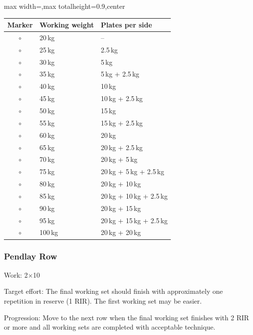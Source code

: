 \documentclass[11pt,a4paper]{article}
\newcommand{\tablearraystretch}{1.15}
\begin{document}
\begin{center}
\renewcommand{\arraystretch}{\tablearraystretch}
\begin{adjustbox}{max width=\linewidth,max totalheight=0.9\textheight,center}
\begin{tabular}{cll}
\toprule
Marker & Working weight & Plates per side \\
\midrule
$\circ$ & 20\,kg  & -- \\
$\circ$ & 25\,kg  & 2.5\,kg \\
$\circ$ & 30\,kg  & 5\,kg \\
$\circ$ & 35\,kg  & 5\,kg + 2.5\,kg \\
$\circ$ & 40\,kg  & 10\,kg \\
$\circ$ & 45\,kg  & 10\,kg + 2.5\,kg \\
$\circ$ & 50\,kg  & 15\,kg \\
$\circ$ & 55\,kg  & 15\,kg + 2.5\,kg \\
$\circ$ & 60\,kg  & 20\,kg \\
$\circ$ & 65\,kg  & 20\,kg + 2.5\,kg \\
$\circ$ & 70\,kg  & 20\,kg + 5\,kg \\
$\circ$ & 75\,kg  & 20\,kg + 5\,kg + 2.5\,kg \\
$\circ$ & 80\,kg  & 20\,kg + 10\,kg \\
$\circ$ & 85\,kg  & 20\,kg + 10\,kg + 2.5\,kg \\
$\circ$ & 90\,kg  & 20\,kg + 15\,kg \\
$\circ$ & 95\,kg  & 20\,kg + 15\,kg + 2.5\,kg \\
$\circ$ & 100\,kg & 20\,kg + 20\,kg \\
\bottomrule
\end{tabular}
\end{adjustbox}
\renewcommand{\arraystretch}{1}
\end{center}

\newpage
\subsubsection{Pendlay Row}

Work: 2$\times$10

Target effort: The final working set should finish with approximately one repetition in reserve (1 RIR). The first working set may be easier.

Progression: Move to the next row when the final working set finishes with 2 RIR or more and all working sets are completed with acceptable technique.
\end{document}

